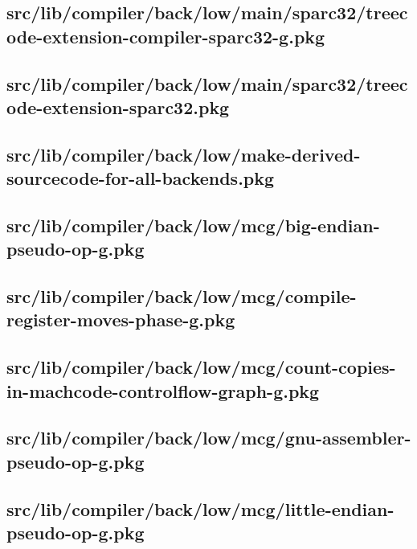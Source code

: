 \subsection{src/lib/compiler/back/low/main/sparc32/treecode-extension-compiler-sparc32-g.pkg}


\subsection{src/lib/compiler/back/low/main/sparc32/treecode-extension-sparc32.pkg}


\subsection{src/lib/compiler/back/low/make-derived-sourcecode-for-all-backends.pkg}


\subsection{src/lib/compiler/back/low/mcg/big-endian-pseudo-op-g.pkg}


\subsection{src/lib/compiler/back/low/mcg/compile-register-moves-phase-g.pkg}


\subsection{src/lib/compiler/back/low/mcg/count-copies-in-machcode-controlflow-graph-g.pkg}


\subsection{src/lib/compiler/back/low/mcg/gnu-assembler-pseudo-op-g.pkg}


\subsection{src/lib/compiler/back/low/mcg/little-endian-pseudo-op-g.pkg}



